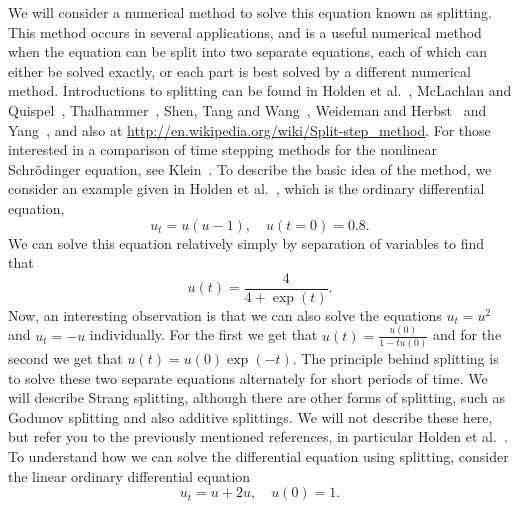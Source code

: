 We will consider a numerical method to solve this equation known as splitting. This method occurs in several applications, and is a useful numerical method when the equation can be split into two separate equations, each of which can either be solved exactly, or each part is best solved by a different numerical method. Introductions to splitting can be found in Holden et al.~\cite{HolKarLieRis10}, McLachlan and Quispel~\cite{McLQui02}, Thalhammer~\cite{Tha08}, Shen, Tang and Wang~\cite{SheTanWan11}, Weideman and Herbst~\cite{WeiHer86} and Yang~\cite{Yan10}, and also at \url{http://en.wikipedia.org/wiki/Split-step_method}. For those interested in a comparison of time stepping methods for the nonlinear Schr\"{o}dinger equation, see Klein~\cite{Kle08}. To describe the basic idea of the method, we consider an example given in Holden et al.~\cite{HolKarRisTao11}, which is the ordinary differential equation,
\begin{equation}\label{eq:SplitOde}
u_t=u(u-1),\quad u(t=0)=0.8.
\end{equation}
We can solve this equation relatively simply by separation of variables to find that
\begin{equation}
u(t)=\frac{4}{4+\exp(t)}.
\end{equation}
Now, an interesting observation is that we can also solve the equations $u_t=u^2$ and $u_t=-u$ individually. For the first we get that $u(t)=\frac{u(0)}{1-tu(0)}$ and for the second we get that $u(t)=u(0)\exp(-t)$. The principle behind splitting is to solve these two separate equations alternately for short periods of time. We will describe Strang splitting, although there are other forms of splitting, such as Godunov splitting and also additive splittings.  We will not describe these here, but refer you to the previously mentioned references, in particular Holden et al.~\cite{HolKarLieRis10}. To understand how we can solve the differential equation using splitting, consider the linear ordinary differential equation
\begin{equation}
u_t=u+2u,\quad u(0)=1.
\end{equation}
